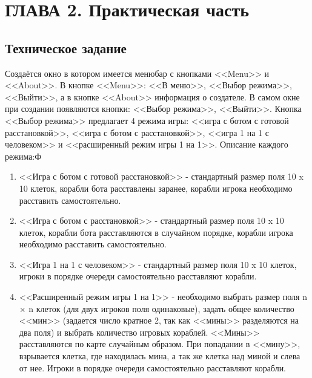 \chapter{\label{ch:ch02}ГЛАВА 2. Практическая часть}
\section{\label{sec:ch02/sec01}Техническое задание}
Создаётся окно в котором имеется менюбар с кнопками <<Menu>> и <<About>>. В кнопке <<Menu>>: <<В меню>>, <<Выбор режима>>, <<Выйти>>, а в кнопке <<About>> информация о создателе. В самом окне при создании появляются кнопки: <<Выбор режима>>, <<Выйти>>. Кнопка <<Выбор режима>> предлагает 4 режима игры: <<игра с ботом с готовой расстановкой>>, <<игра с ботом с расстановкой>>, <<игра 1 на 1 с человеком>> и <<расширенный режим игры 1 на 1>>. 
Описание каждого режима:Ф
\begin{enumerate}
\item <<Игра с ботом с готовой расстановкой>> - стандартный размер поля 10 x 10 клеток, корабли бота расставлены заранее, корабли игрока необходимо расставить самостоятельно.
\item <<Игра с ботом с расстановкой>> - стандартный размер поля 10 x 10 клеток, корабли бота расставляются в случайном порядке, корабли игрока необходимо расставить самостоятельно.
\item <<Игра 1 на 1 с человеком>> - стандартный размер поля 10 x 10 клеток, игроки в порядке очереди самостоятельно расставляют корабли.
\item <<Расширенный режим игры 1 на 1>> - необходимо выбрать размер поля \- n × n клеток (для двух игроков поля одинаковые), задать общее количество <<мин>> (задается число кратное 2, так как <<мины>> разделяются на два поля) и выбрать количество игровых кораблей. <<Мины>> расставляются по карте случайным образом. При попадании в <<мину>>, взрывается клетка, где находилась мина, а так же клетка над миной и слева от  нее.  Игроки в порядке очереди самостоятельно расставляют корабли.
\end{enumerate}
